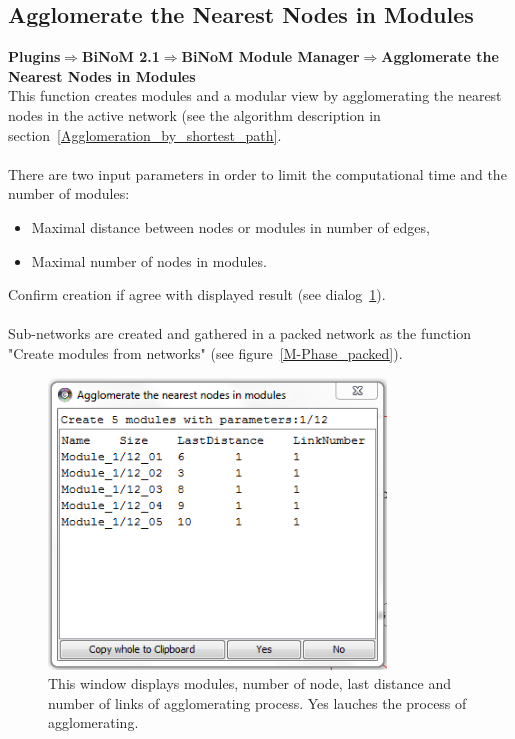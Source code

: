 \subsection{Agglomerate the Nearest Nodes in Modules}
\textbf{Plugins$\Rightarrow$BiNoM 2.1$\Rightarrow$BiNoM Module Manager$\Rightarrow$Agglomerate the Nearest Nodes in Modules}\\
This function creates modules and a modular view by agglomerating the nearest nodes in the active network (see the algorithm description in section~\ref{Agglomeration_by_shortest_path}.\\\\
There are two input parameters in order to limit the computational time and the number of modules:
\begin{itemize}
\item Maximal distance between nodes or modules in number of edges,
\item Maximal number of nodes in modules.
\end{itemize}
Confirm creation if agree with displayed result (see dialog~\ref{Agglomerate_in_modules_dialog}).\\\\
Sub-networks are created and gathered in a packed network as the function "Create modules from networks" (see figure~\ref{M-Phase_packed}).
\begin{figure}
\centering
\includegraphics[width=0.8\textwidth]{graphics/Agglomerate_in_modules_dialog}
\caption{This window displays modules, number of node, last distance and number of links of agglomerating process. Yes lauches the process of agglomerating.}
\label{Agglomerate_in_modules_dialog}
\end{figure}
